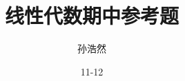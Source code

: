\documentclass[a4paper]{article}
\begin{document}
\title{\textbf{线性代数期中参考题}}

\author{孙浩然}
\date{11-12}
\maketitle

	
	
\end{document}

